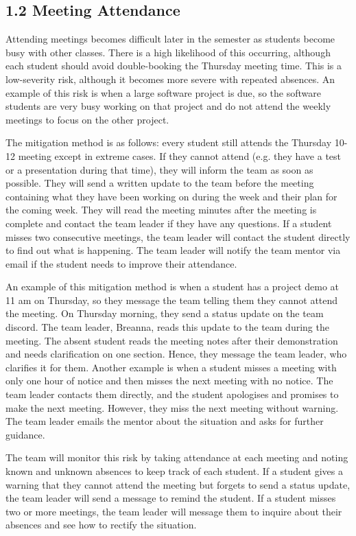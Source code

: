 \subsection*{1.2 Meeting Attendance}

Attending meetings becomes difficult later in the semester as students become busy with other classes. There is a high likelihood of this occurring, although each student should avoid double-booking the Thursday meeting time. This is a low-severity risk, although it becomes more severe with repeated absences. An example of this risk is when a large software project is due, so the software students are very busy working on that project and do not attend the weekly meetings to focus on the other project. 

The mitigation method is as follows: every student still attends the Thursday 10-12 meeting except in extreme cases. If they cannot attend (e.g. they have a test or a presentation during that time), they will inform the team as soon as possible. They will send a written update to the team before the meeting containing what they have been working on during the week and their plan for the coming week. They will read the meeting minutes after the meeting is complete and contact the team leader if they have any questions. If a student misses two consecutive meetings, the team leader will contact the student directly to find out what is happening. The team leader will notify the team mentor via email if the student needs to improve their attendance.

An example of this mitigation method is when a student has a project demo at 11 am on Thursday, so they message the team telling them they cannot attend the meeting. On Thursday morning, they send a status update on the team discord. The team leader, Breanna, reads this update to the team during the meeting. The absent student reads the meeting notes after their demonstration and needs clarification on one section. Hence, they message the team leader, who clarifies it for them. Another example is when a student misses a meeting with only one hour of notice and then misses the next meeting with no notice. The team leader contacts them directly, and the student apologises and promises to make the next meeting. However, they miss the next meeting without warning. The team leader emails the mentor about the situation and asks for further guidance. 

The team will monitor this risk by taking attendance at each meeting and noting known and unknown absences to keep track of each student. If a student gives a warning that they cannot attend the meeting but forgets to send a status update, the team leader will send a message to remind the student. If a student misses two or more meetings, the team leader will message them to inquire about their absences and see how to rectify the situation.

